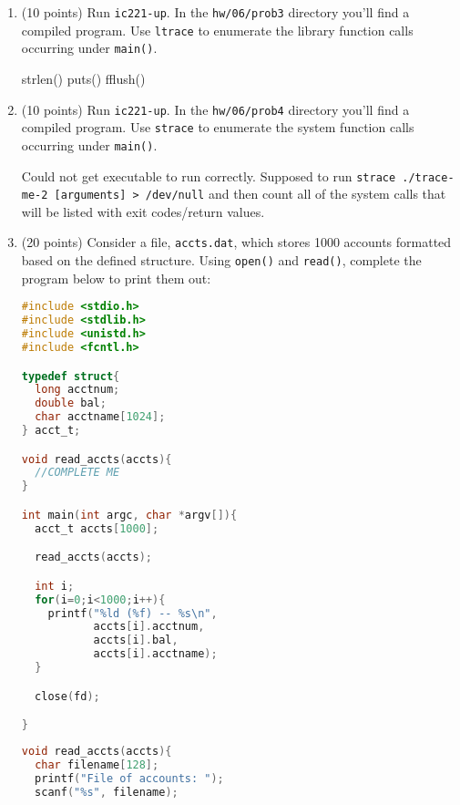 \documentclass{article}[9pt]
\newenvironment{answerfont}{\fontfamily{qhv}\selectfont}{\par}
\newenvironment{myanswer}{\begin{mdframed}\begin{answerfont}}{\end{answerfont}\end{mdframed}}
\begin{document}
\begin{enumerate}
\begin{enumerate}
\end{enumerate}

\item (10 points) Run \texttt{ic221-up}. In the \texttt{hw/06/prob3} directory you'll find a compiled
program. Use \texttt{ltrace} to enumerate the library function calls
occurring under \texttt{main()}.

\begin{myanswer}
3
strlen()
puts()
fflush()
\end{myanswer}

\item (10 points) Run \texttt{ic221-up}. In the \texttt{hw/06/prob4} directory you'll find a compiled
program. Use \texttt{strace} to enumerate the system function calls
occurring under \texttt{main()}.

\begin{myanswer}
Could not get executable to run correctly. Supposed to run
\texttt{strace ./trace-me-2 [arguments] > /dev/null} and then count all
of the system calls that will be listed with exit codes/return values.
\end{myanswer}

\item (20 points) Consider a file, \texttt{accts.dat}, which stores 1000 accounts
formatted based on the defined structure. Using \texttt{open()} and
\texttt{read()}, complete the program below to print them out:


\begin{lstlisting}[language=c]
#include <stdio.h>
#include <stdlib.h>
#include <unistd.h>
#include <fcntl.h>

typedef struct{
  long acctnum;
  double bal;
  char acctname[1024];
} acct_t;

void read_accts(accts){
  //COMPLETE ME
}

int main(int argc, char *argv[]){
  acct_t accts[1000];

  read_accts(accts);

  int i;
  for(i=0;i<1000;i++){
    printf("%ld (%f) -- %s\n",
           accts[i].acctnum,
           accts[i].bal,
           accts[i].acctname);
  }

  close(fd);

}
\end{lstlisting}

\begin{myanswer}
\begin{lstlisting}[language=c]
void read_accts(accts){
  char filename[128];
  printf("File of accounts: ");
  scanf("%s", filename);


\end{lstlisting}
\end{myanswer}
\end{enumerate}
\end{document}
